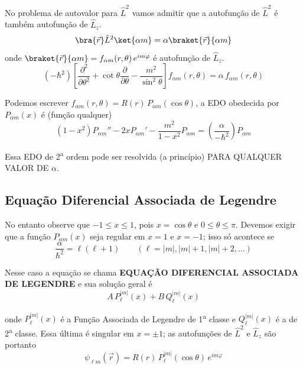 No problema de autovalor para $\hat{L}^2$ vamos admitir que a autofunção de $\hat{L}^2$ é também autofunção de $\hat{L}_z$.
\begin{equation}
    \bra{\vec{r}}\hat{L}^2\ket{\alpha m} = \alpha \braket{\vec{r}}{\alpha m}
\label{eq:aula19_L2_autovalor_alpha}
\end{equation}
onde $\braket{\vec{r}}{\alpha m} = f_{\alpha m}(r,\theta)\, e^{im\varphi}$ é autofunção de $\hat{L}_z$.
\begin{equation}
    (-\hbar^2)\left[ \frac{\partial^2}{\partial \theta^2} + \cot\theta \frac{\partial}{\partial \theta} - \frac{m^2}{\sin^2\theta} \right] f_{\alpha m}(r,\theta) = \alpha \, f_{\alpha m}(r,\theta)
\label{eq:aula19_L2_EDP_theta}
\end{equation}

Podemos escrever $f_{\alpha m}(r,\theta) = R(r)\, P_{\alpha m}(\cos\theta)$, a EDO obedecida por $P_{\alpha m}(x)$ é (função qualquer)
\begin{equation}
    (1-x^2)P_{\alpha m}'' - 2x P_{\alpha m}' - \frac{m^2}{1-x^2}P_{\alpha m} = \left(\frac{\alpha}{-\hbar^2}\right)P_{\alpha m}
\label{eq:aula19_EDO_legendre_generica}
\end{equation}

Essa EDO de 2\textsuperscript{a} ordem pode ser resolvida (a princípio) PARA QUALQUER VALOR DE $\alpha$.

\subsection*{Equação Diferencial Associada de Legendre}

No entanto observe que $-1 \leq x \leq 1$, pois $x = \cos\theta$ e $0 \leq \theta \leq \pi$. Devemos exigir que a função $P_{\alpha m}(x)$ seja regular em $x=1$ e $x=-1$; isso só acontece se
\begin{equation}
    \frac{\alpha}{\hbar^2} = \ell(\ell+1) \qquad (\ell = |m|, |m|+1, |m|+2, \dots)
\label{eq:aula19_alpha_quantizado}
\end{equation}

Nesse caso a equação se chama \textbf{EQUAÇÃO DIFERENCIAL ASSOCIADA DE LEGENDRE} e sua solução geral é
\begin{equation}
    A\, P_\ell^{|m|}(x) + B\, Q_\ell^{|m|}(x)
\label{eq:aula19_solucao_legendre_geral}
\end{equation}

onde $P_\ell^{|m|}(x)$ é a Função Associada de Legendre de 1\textsuperscript{a} classe e $Q_\ell^{|m|}(x)$ é a de 2\textsuperscript{a} classe. Essa última é singular em $x=\pm1$; as autofunções de $\hat{L}^2$ e $\hat{L}_z$ são portanto
\begin{equation}
    \psi_{\ell m}(\vec{r}) = R(r)\, P_\ell^{|m|}(\cos\theta)\, e^{im\varphi}
\label{eq:aula19_autofuncoes_L2_Lz}
\end{equation}

